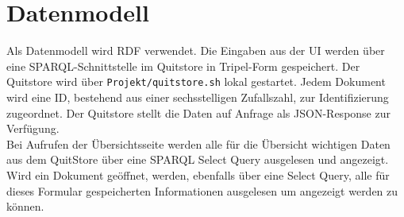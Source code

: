 \documentclass[a4paper,11pt,oneside, titlepage]{article}
\begin{document}
\section{Datenmodell}
Als Datenmodell wird \gls{RDF} verwendet. Die Eingaben aus der UI werden über eine \gls{SPARQL}-Schnittstelle im \gls{Quitstore} in Tripel-Form gespeichert.  Der Quitstore wird über \verb+Projekt/quitstore.sh+ lokal gestartet. Jedem Dokument wird eine ID, bestehend aus einer sechsstelligen Zufallszahl, zur Identifizierung zugeordnet. Der Quitstore stellt die Daten auf Anfrage als \gls{JSON}-Response zur Verfügung. \\ Bei Aufrufen der Übersichtsseite werden alle für die Übersicht wichtigen Daten aus dem QuitStore über eine SPARQL Select Query ausgelesen und angezeigt. Wird ein Dokument geöffnet, werden, ebenfalls über eine Select Query, alle für dieses Formular gespeicherten Informationen ausgelesen um angezeigt werden zu können.

  \printglossaries
\end{document}
